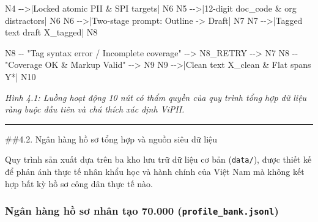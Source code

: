 \documentclass[
  11pt,
  a4paper,
]{article}
\newenvironment{Shaded}{}{}
\newcommand{\NormalTok}[1]{#1}
\begin{document}
\begin{Shaded}
\begin{Highlighting}[]
\NormalTok{    N4 {-}{-}\textgreater{}|Locked atomic PII \& SPI targets| N6}
\NormalTok{    N5 {-}{-}\textgreater{}|12{-}digit doc\_code \& org distractors| N6}
\NormalTok{    N6 {-}{-}\textgreater{}|Two{-}stage prompt: Outline {-}\textgreater{} Draft| N7}
\NormalTok{    N7 {-}{-}\textgreater{}|Tagged text draft X\_tagged| N8}

\NormalTok{    N8 {-}{-} "Tag syntax error / Incomplete coverage" {-}{-}\textgreater{} N8\_RETRY {-}{-}\textgreater{} N7}
\NormalTok{    N8 {-}{-} "Coverage OK \& Markup Valid" {-}{-}\textgreater{} N9}
\NormalTok{    N9 {-}{-}\textgreater{}|Clean text X\_clean \& Flat spans Y*| N10}
\end{Highlighting}
\end{Shaded}

\emph{Hình 4.1: Luồng hoạt động 10 nút có thẩm quyền của quy trình tổng
hợp dữ liệu ràng buộc đầu tiên và chú thích xác định ViPII.}

\begin{center}\rule{0.5\linewidth}{0.5pt}\end{center}

\#\#4.2. Ngân hàng hồ sơ tổng hợp và nguồn siêu dữ liệu

Quy trình sản xuất dựa trên ba kho lưu trữ dữ liệu cơ bản
(\texttt{data/}), được thiết kế để phản ánh thực tế nhân khẩu học và
hành chính của Việt Nam mà không kết hợp bất kỳ hồ sơ công dân thực tế
nào.

\subsubsection{\texorpdfstring{Ngân hàng hồ sơ nhân tạo 70.000
(\texttt{profile\_bank.jsonl})}{Ngân hàng hồ sơ nhân tạo 70.000 (profile\_bank.jsonl)}}\label{nguxe2n-huxe0ng-hux1ed3-sux1a1-nhuxe2n-tux1ea1o-70.000-profile_bank.jsonl}
\end{document}
